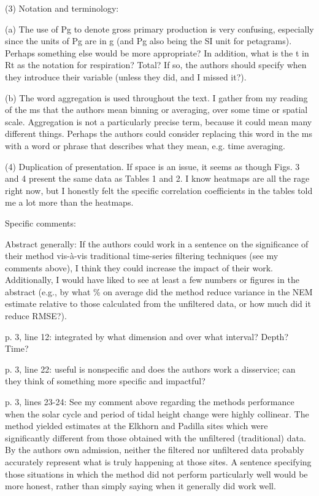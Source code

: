 \documentclass[letterpaper,12pt]{article}\usepackage[]{graphicx}\usepackage[]{color}
\begin{document}
(3) Notation and terminology:

(a) The use of Pg to denote gross primary production is very confusing, especially since the units of Pg are in g (and Pg also being the SI unit for petagrams). Perhaps something else would be more appropriate? In addition, what is the t in Rt as the notation for respiration? Total? If so, the authors should specify when they introduce their variable (unless they did, and I missed it?).

(b) The word aggregation is used throughout the text. I gather from my reading of the ms that the authors mean binning or averaging, over some time or spatial scale. Aggregation is not a particularly precise term, because it could mean many different things. Perhaps the authors could consider replacing this word in the ms with a word or phrase that describes what they mean, e.g. time averaging.

(4) Duplication of presentation. If space is an issue, it seems as though Figs. 3 and 4 present the same data as Tables 1 and 2. I know heatmaps are all the rage right now, but I honestly felt the specific correlation coefficients in the tables told me a lot more than the heatmaps.

Specific comments:

Abstract generally: If the authors could work in a sentence on the significance of their method vis-à-vis traditional time-series filtering techniques (see my comments above), I think they could increase the impact of their work. Additionally, I would have liked to see at least a few numbers or figures in the abstract (e.g., by what \% on average did the method reduce variance in the NEM estimate relative to those calculated from the unfiltered data, or how much did it reduce
RMSE?).

p. 3, line 12: integrated by what dimension and over what interval? Depth? Time?

p. 3, line 22: useful is nonspecific and does the authors work a disservice; can they think of
something more specific and impactful?

p. 3, lines 23-24: See my comment above regarding the methods performance when the solar cycle and period of tidal height change were highly collinear. The method yielded estimates at the Elkhorn and Padilla sites which were significantly different from those obtained with the unfiltered (traditional) data. By the authors own admission, neither the filtered nor unfiltered data probably accurately represent what is truly happening at those sites. A sentence specifying those situations in which the method did not perform particularly well would be more honest, rather than simply saying when it generally did work well.
 
\end{document}
